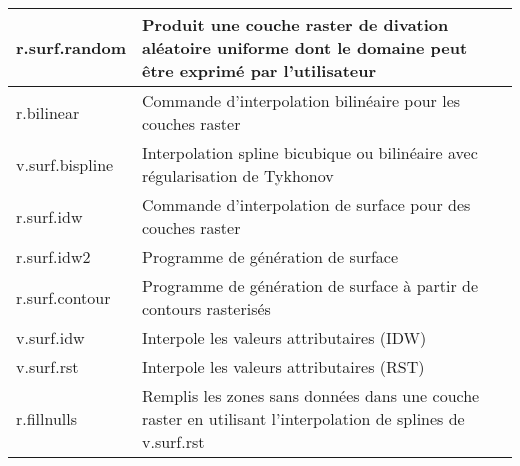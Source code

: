\begin{table}[ht]
\begin{tabular}{|p{4cm}|p{12cm}|}
  \hline r.surf.random & Produit une couche raster de divation al\'eatoire uniforme dont le domaine peut \^etre exprim\'e par l'utilisateur\\
  \hline r.bilinear & Commande d'interpolation bilin\'eaire pour les couches raster \\
  \hline v.surf.bispline & Interpolation spline bicubique ou bilin\'eaire avec r\'egularisation de Tykhonov \\
  \hline r.surf.idw & Commande d'interpolation de surface pour des couches raster\\
  \hline r.surf.idw2 & Programme de g\'en\'eration de surface\\
  \hline r.surf.contour & Programme de g\'en\'eration de surface \`a partir de contours rasteris\'es \\
  \hline v.surf.idw & Interpole les valeurs attributaires (IDW) \\
  \hline v.surf.rst & Interpole les valeurs attributaires (RST) \\
  \hline r.fillnulls & Remplis les zones sans donn\'ees dans une couche raster en utilisant l'interpolation de splines de v.surf.rst \\
\hline
\end{tabular}
\end{table}

